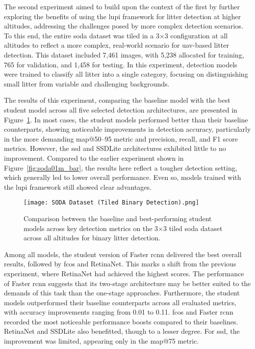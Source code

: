 The second experiment aimed to build upon the context of the first by further exploring the benefits of using the \gls{lupi} framework for litter detection at higher altitudes, addressing the challenges posed by more complex detection scenarios. To this end, the entire \gls{soda} dataset was tiled in a 3$\times$3 configuration at all altitudes to reflect a more complex, real-world scenario for \gls{uav}-based litter detection. This dataset included 7,461 images, with 5,238 allocated for training, 765 for validation, and 1,458 for testing. In this experiment, detection models were trained to classify all litter into a single category, focusing on distinguishing small litter from variable and challenging backgrounds.

The results of this experiment, comparing the baseline model with the best student model across all five selected detection architectures, are presented in Figure~\ref{fig:soda_tiled_single_bar}. In most cases, the student models performed better than their baseline counterparts, showing noticeable improvements in detection accuracy, particularly in the more demanding \gls{map}@50–95 metric and precision, recall, and F1 score metrics. However, the \gls{ssd} and SSDLite architectures exhibited little to no improvement.
Compared to the earlier experiment shown in Figure~\ref{fig:soda01m_bar}, the results here reflect a tougher detection setting, which generally led to lower overall performance. Even so, models trained with the \gls{lupi} framework still showed clear advantages. 

\begin{figure}[!ht]
    \centering
    \texttt{[image: SODA Dataset (Tiled Binary Detection).png]}
    \caption{Comparison between the baseline and best-performing student models across key detection metrics on the 3$\times$3 tiled \gls{soda} dataset across all altitudes for binary litter detection.}
    \label{fig:soda_tiled_single_bar}
\end{figure}

Among all models, the student version of Faster \gls{rcnn} delivered the best overall results, followed by \gls{fcos} and RetinaNet. This marks a shift from the previous experiment, where RetinaNet had achieved the highest scores. The performance of Faster \gls{rcnn} suggests that its two-stage architecture may be better suited to the demands of this task than the one-stage approaches. Furthermore, the student models outperformed their baseline counterparts across all evaluated metrics, with accuracy improvements ranging from 0.01 to 0.11. \gls{fcos} and Faster \gls{rcnn} recorded the most noticeable performance boosts compared to their baselines. RetinaNet and SSDLite also benefitted, though to a lesser degree. For \gls{ssd}, the improvement was limited, appearing only in the \gls{map}@75 metric.

